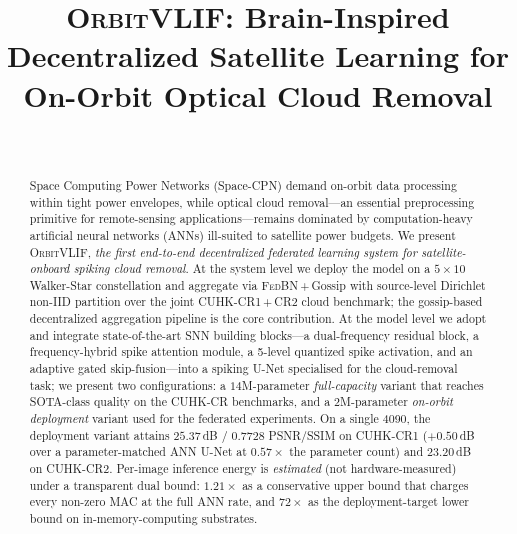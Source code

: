 \documentclass[conference]{IEEEtran}
\newcommand{\OrbitVLIF}{\textsc{OrbitVLIF}}
\begin{document}
\title{\OrbitVLIF: Brain-Inspired Decentralized Satellite Learning for
       On-Orbit Optical Cloud Removal}

\author{
  \\
}

\maketitle

\begin{abstract}
Space Computing Power Networks (Space-CPN) demand on-orbit data
processing within tight power envelopes, while optical cloud
removal---an essential preprocessing primitive for remote-sensing
applications---remains dominated by computation-heavy artificial
neural networks (ANNs) ill-suited to satellite power budgets.
We present \OrbitVLIF, \emph{the first end-to-end decentralized
federated learning system for satellite-onboard spiking cloud
removal}. At the system level we deploy the model on a
$5\!\times\!10$ Walker-Star constellation and aggregate via
\textsc{FedBN}\,+\,Gossip with source-level Dirichlet non-IID
partition over the joint CUHK-CR1\,+\,CR2 cloud benchmark; the
gossip-based decentralized aggregation pipeline is the core
contribution.  At the model level we adopt and integrate
state-of-the-art SNN building blocks---a dual-frequency residual
block, a frequency-hybrid spike attention module, a 5-level
quantized spike activation, and an adaptive gated skip-fusion---into a
spiking U-Net specialised for the cloud-removal task; we present
two configurations: a $14$M-parameter \emph{full-capacity} variant
that reaches SOTA-class quality on the CUHK-CR benchmarks, and a
$2$M-parameter \emph{on-orbit deployment} variant used for the
federated experiments. On a single 4090, the deployment variant
attains $25.37$\,dB / $0.7728$ PSNR/SSIM on CUHK-CR1
($+0.50$\,dB over a parameter-matched ANN U-Net at $0.57\!\times\!$
the parameter count) and $23.20$\,dB on CUHK-CR2.  Per-image
inference energy is \emph{estimated} (not hardware-measured) under
a transparent dual bound: $1.21\!\times\!$ as a conservative upper
bound that charges every non-zero MAC at the full ANN rate, and
$72\!\times\!$ as the deployment-target lower bound on
in-memory-computing substrates.
\end{abstract}
\end{document}
